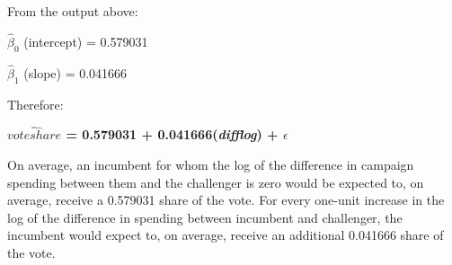 \documentclass[12pt,letterpaper]{article}
\begin{document}
\begin{enumerate}
		From the output above:
		
		$\hat{\beta}_0$ (intercept) = 0.579031
		
		$\hat{\beta}_1$ (slope) = 0.041666 
		
		\vspace{.5cm} Therefore:
		
\textbf{		$\hat{voteshare}$ = 0.579031 + 0.041666(\textit{difflog}) + $\epsilon$}

	On average, an incumbent for whom the log of the difference in campaign spending between them and the challenger is zero would be expected to, on average, receive a 0.579031 share of the vote. For every one-unit increase in the log of the difference in spending between incumbent and challenger, the incumbent would expect to, on average, receive an additional 0.041666 share of the vote. \vspace{0.5cm}
		
	\end{enumerate}
	
\newpage
\end{document}
